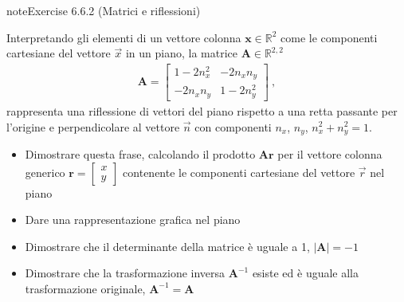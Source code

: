 \documentclass[letterpaper,10pt,italian]{jupyterBook}
\begin{document}
 \label{exercise:ch/algebra/linear-algebra-exercise-8}

\begin{sphinxadmonition}{note}{Exercise 6.6.2 (Matrici e riflessioni)}



\sphinxAtStartPar
Interpretando gli elementi di un vettore colonna \(\mathbf{x} \in \mathbb{R}^2\) come le componenti cartesiane del vettore \(\vec{x}\) in un piano, la matrice \(\mathbf{A} \in \mathbb{R}^{2,2}\)
\begin{equation*}
\begin{split}\mathbf{A} = \begin{bmatrix} 1 - 2 n_x^2 & - 2 n_x n_y \\  - 2 n_x n_y & 1 - 2 n_y^2 \end{bmatrix} \ ,\end{split}
\end{equation*}
\sphinxAtStartPar
rappresenta una riflessione di vettori del piano rispetto a una retta passante per l’origine e perpendicolare al vettore \(\vec{n}\) con componenti \(n_x\), \(n_y\), \(n_x^2 + n_y^2 = 1\).
\begin{itemize}
\item {} 
\sphinxAtStartPar
Dimostrare questa frase, calcolando il prodotto \(\mathbf{A} \mathbf{r}\) per il vettore colonna generico \(\mathbf{r} = \begin{bmatrix} x \\ y \end{bmatrix}\) contenente le componenti cartesiane del vettore \(\vec{r}\) nel piano

\item {} 
\sphinxAtStartPar
Dare una rappresentazione grafica nel piano

\item {} 
\sphinxAtStartPar
Dimostrare che il determinante della matrice è uguale a \sphinxhyphen{}1, \(|\mathbf{A}| = -1\)

\item {} 
\sphinxAtStartPar
Dimostrare che la trasformazione inversa \(\mathbf{A}^{-1}\) esiste ed è uguale alla trasformazione originale, \(\mathbf{A}^{-1} = \mathbf{A}\)

\end{itemize}
\end{sphinxadmonition}
 \label{exercise:ch/algebra/linear-algebra-exercise-9}
\end{document}
